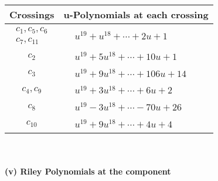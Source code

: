 \documentclass[1p]{elsarticle_modified}
\theoremstyle{definition}
\begin{document}
\begin{tabular}{m{50pt}|m{274pt}}
Crossings & \hspace{64pt}u-Polynomials at each crossing \\
\hline $$\begin{aligned}c_{1},c_{5},c_{6}\\c_{7},c_{11}\end{aligned}$$&$\begin{aligned}
&u^{19}+u^{18}+\cdots+2 u+1
\end{aligned}$\\
\hline $$\begin{aligned}c_{2}\end{aligned}$$&$\begin{aligned}
&u^{19}+5 u^{18}+\cdots+10 u+1
\end{aligned}$\\
\hline $$\begin{aligned}c_{3}\end{aligned}$$&$\begin{aligned}
&u^{19}+9 u^{18}+\cdots+106 u+14
\end{aligned}$\\
\hline $$\begin{aligned}c_{4},c_{9}\end{aligned}$$&$\begin{aligned}
&u^{19}+3 u^{18}+\cdots+6 u+2
\end{aligned}$\\
\hline $$\begin{aligned}c_{8}\end{aligned}$$&$\begin{aligned}
&u^{19}-3 u^{18}+\cdots-70 u+26
\end{aligned}$\\
\hline $$\begin{aligned}c_{10}\end{aligned}$$&$\begin{aligned}
&u^{19}+9 u^{18}+\cdots+4 u+4
\end{aligned}$\\
\hline
\end{tabular}\\~\\
\newpage\renewcommand{\arraystretch}{1}
\flushleft \textbf{(v) Riley Polynomials at the component}\newline \\
\end{document}
